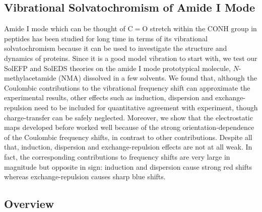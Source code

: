 \documentclass[a4paper,titlepage,twoside,fleqn,12pt]{book}
\begin{document}
\begin{refsection}
%


\printbibliography[heading=subbibintoc,title={References}]
\end{refsection}


\begin{refsection}
\chapter{Vibrational Solvatochromism of Amide I Mode\label{c:nma-amide-I}}

Amide I mode which can be thought of C$=$O stretch within
the CONH group in peptides has been studied for long time
in terms of its vibrational solvatochromism because it can
be used to investigate the structure and dynamics of proteins. 
Since it is a good model vibration to start with,
we test our SolEFP and SolEDS theories on the amide I mode
prototypical molecule, $N$-methylacetamide (NMA) dissolved
in a few solvents. We found that, although the Coulombic
contributions to the vibrational frequency shift can approximate
the experimental results, other effects such as induction,
dispersion and exchange\hyp{}repulsion need to be included
for quantitative agreement with experiment, though charge\hyp{}transfer
can be safely neglected. Moreover, we show that the electrostatic
maps developed before worked well because of the strong
orientation\hyp{}dependence of the Coulombic frequency shifts,
in contrast to other contributions. Despite all that, induction,
dispersion and exchange\hyp{}repulsion effects are not at all
weak. In fact, the corresponding contributions to frequency shifts
are very large in magnitude but opposite in sign: induction
and dispersion cause strong red shifts whereas exchange\hyp{}repulsion
causes sharp blue shifts.

\section{Overview}


\end{refsection}
\end{document}
